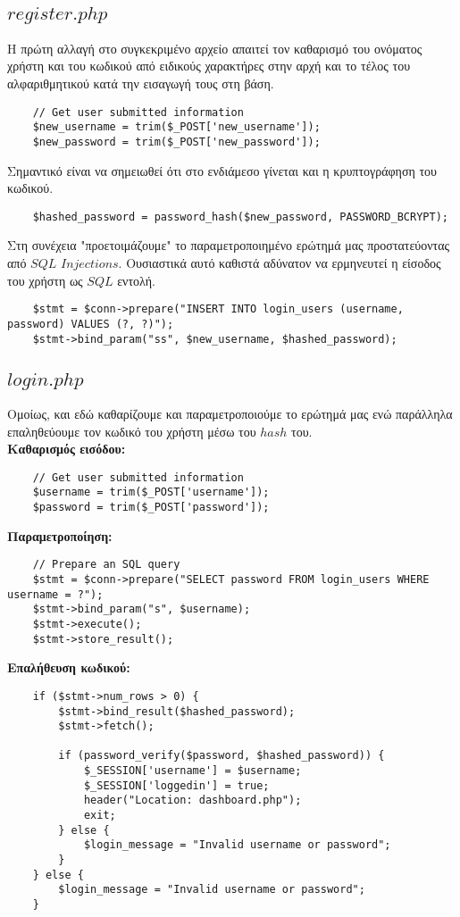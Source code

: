 \documentclass{report}
\begin{document}
\subsection*{$register.php$}
Η πρώτη αλλαγή στο συγκεκριμένο αρχείο απαιτεί τον καθαρισμό του ονόματος χρήστη και του κωδικού
από ειδικούς χαρακτήρες στην αρχή και το τέλος του αλφαριθμητικού κατά την εισαγωγή τους στη βάση.
\begin{verbatim}
    // Get user submitted information
    $new_username = trim($_POST['new_username']);
    $new_password = trim($_POST['new_password']);
\end{verbatim}
Σημαντικό είναι να σημειωθεί ότι στο ενδιάμεσο γίνεται και η κρυπτογράφηση του κωδικού.
\begin{verbatim}
    $hashed_password = password_hash($new_password, PASSWORD_BCRYPT);
\end{verbatim}
Στη συνέχεια "προετοιμάζουμε" το παραμετροποιημένο ερώτημά μας προστατεύοντας από $SQL$ $Injections$. 
Ουσιαστικά αυτό καθιστά αδύνατον να ερμηνευτεί η είσοδος του χρήστη ως $SQL$ εντολή.
\begin{verbatim}
    $stmt = $conn->prepare("INSERT INTO login_users (username, password) VALUES (?, ?)");
    $stmt->bind_param("ss", $new_username, $hashed_password);
\end{verbatim}
\subsection*{$login.php$}
Ομοίως, και εδώ καθαρίζουμε και παραμετροποιούμε το ερώτημά μας ενώ παράλληλα επαληθεύουμε
τον κωδικό του χρήστη μέσω του $hash$ του.\\
\textbf{Καθαρισμός εισόδου:}
\begin{verbatim}
    // Get user submitted information
    $username = trim($_POST['username']);
    $password = trim($_POST['password']);
\end{verbatim}
\textbf{Παραμετροποίηση:}
\begin{verbatim}
    // Prepare an SQL query
    $stmt = $conn->prepare("SELECT password FROM login_users WHERE username = ?");
    $stmt->bind_param("s", $username);
    $stmt->execute();
    $stmt->store_result();
\end{verbatim}
\textbf{Επαλήθευση κωδικού:}
\begin{verbatim}
    if ($stmt->num_rows > 0) {
        $stmt->bind_result($hashed_password);
        $stmt->fetch();

        if (password_verify($password, $hashed_password)) {
            $_SESSION['username'] = $username;
            $_SESSION['loggedin'] = true;
            header("Location: dashboard.php");
            exit;
        } else {
            $login_message = "Invalid username or password";
        }
    } else {
        $login_message = "Invalid username or password";
    }
\end{verbatim}
\end{document}
